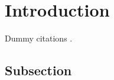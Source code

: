 \graphicspath{{images/}}

\section{Introduction}
\label{sec:introduction}
Dummy \citet{Lawless2010} citations \citep{Heydari2016} \citep{Addinall2008}.

\subsection{Subsection}

